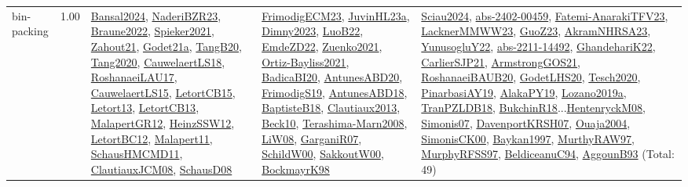 {\begin{longtable}{p{3cm}r>{\raggedright\arraybackslash}p{6cm}>{\raggedright\arraybackslash}p{6cm}>{\raggedright\arraybackslash}p{8cm}}
\index{bin-packing}\index{Constraints!bin-packing}bin-packing &  1.00 & \hyperref[detail:Bansal2024]{Bansal2024}, \hyperref[detail:NaderiBZR23]{NaderiBZR23}, \hyperref[detail:Braune2022]{Braune2022}, \hyperref[detail:Spieker2021]{Spieker2021}, \hyperref[detail:Zahout21]{Zahout21}, \hyperref[detail:Godet21a]{Godet21a}, \hyperref[detail:TangB20]{TangB20}, \hyperref[detail:Tang2020]{Tang2020}, \hyperref[detail:CauwelaertLS18]{CauwelaertLS18}, \hyperref[detail:RoshanaeiLAU17]{RoshanaeiLAU17}, \hyperref[detail:CauwelaertLS15]{CauwelaertLS15}, \hyperref[detail:LetortCB15]{LetortCB15}, \hyperref[detail:Letort13]{Letort13}, \hyperref[detail:LetortCB13]{LetortCB13}, \hyperref[detail:MalapertGR12]{MalapertGR12}, \hyperref[detail:HeinzSSW12]{HeinzSSW12}, \hyperref[detail:LetortBC12]{LetortBC12}, \hyperref[detail:Malapert11]{Malapert11}, \hyperref[detail:SchausHMCMD11]{SchausHMCMD11}, \hyperref[detail:ClautiauxJCM08]{ClautiauxJCM08}, \hyperref[detail:SchausD08]{SchausD08} & \hyperref[detail:FrimodigECM23]{FrimodigECM23}, \hyperref[detail:JuvinHL23a]{JuvinHL23a}, \hyperref[detail:Dimny2023]{Dimny2023}, \hyperref[detail:LuoB22]{LuoB22}, \hyperref[detail:EmdeZD22]{EmdeZD22}, \hyperref[detail:Zuenko2021]{Zuenko2021}, \hyperref[detail:Ortiz-Bayliss2021]{Ortiz-Bayliss2021}, \hyperref[detail:BadicaBI20]{BadicaBI20}, \hyperref[detail:AntunesABD20]{AntunesABD20}, \hyperref[detail:FrimodigS19]{FrimodigS19}, \hyperref[detail:AntunesABD18]{AntunesABD18}, \hyperref[detail:BaptisteB18]{BaptisteB18}, \hyperref[detail:Clautiaux2013]{Clautiaux2013}, \hyperref[detail:Beck10]{Beck10}, \hyperref[detail:Terashima-Marn2008]{Terashima-Marn2008}, \hyperref[detail:LiW08]{LiW08}, \hyperref[detail:GarganiR07]{GarganiR07}, \hyperref[detail:SchildW00]{SchildW00}, \hyperref[detail:SakkoutW00]{SakkoutW00}, \hyperref[detail:BockmayrK98]{BockmayrK98} & \hyperref[detail:Sciau2024]{Sciau2024}, \hyperref[detail:abs-2402-00459]{abs-2402-00459}, \hyperref[detail:Fatemi-AnarakiTFV23]{Fatemi-AnarakiTFV23}, \hyperref[detail:LacknerMMWW23]{LacknerMMWW23}, \hyperref[detail:GuoZ23]{GuoZ23}, \hyperref[detail:AkramNHRSA23]{AkramNHRSA23}, \hyperref[detail:YunusogluY22]{YunusogluY22}, \hyperref[detail:abs-2211-14492]{abs-2211-14492}, \hyperref[detail:GhandehariK22]{GhandehariK22}, \hyperref[detail:CarlierSJP21]{CarlierSJP21}, \hyperref[detail:ArmstrongGOS21]{ArmstrongGOS21}, \hyperref[detail:RoshanaeiBAUB20]{RoshanaeiBAUB20}, \hyperref[detail:GodetLHS20]{GodetLHS20}, \hyperref[detail:Tesch2020]{Tesch2020}, \hyperref[detail:PinarbasiAY19]{PinarbasiAY19}, \hyperref[detail:AlakaPY19]{AlakaPY19}, \hyperref[detail:Lozano2019a]{Lozano2019a}, \hyperref[detail:TranPZLDB18]{TranPZLDB18}, \hyperref[detail:BukchinR18]{BukchinR18}...\hyperref[detail:HentenryckM08]{HentenryckM08}, \hyperref[detail:Simonis07]{Simonis07}, \hyperref[detail:DavenportKRSH07]{DavenportKRSH07}, \hyperref[detail:Ouaja2004]{Ouaja2004}, \hyperref[detail:SimonisCK00]{SimonisCK00}, \hyperref[detail:Baykan1997]{Baykan1997}, \hyperref[detail:MurthyRAW97]{MurthyRAW97}, \hyperref[detail:MurphyRFSS97]{MurphyRFSS97}, \hyperref[detail:BeldiceanuC94]{BeldiceanuC94}, \hyperref[detail:AggounB93]{AggounB93} (Total: 49)\\

\end{longtable}}

